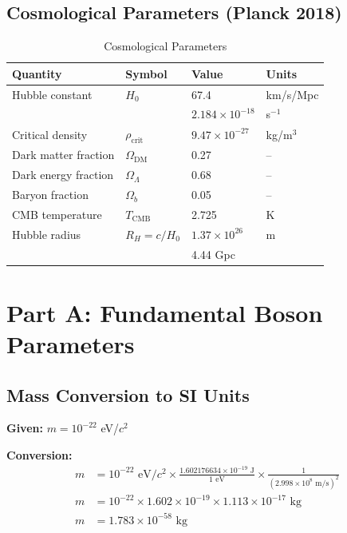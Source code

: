 \documentclass[11pt,a4paper]{article}
\newcommand{\ee}[1]{\times 10^{#1}}
\newcommand{\rhocrit}{\ensuremath{\rho_{\mathrm{crit}}}}
\begin{document}
\subsection{Cosmological Parameters (Planck 2018)}

\begin{table}[H]
\centering
\caption{Cosmological Parameters}
\label{tab:cosmo}
\begin{tabular}{@{}llll@{}}
\toprule
\textbf{Quantity} & \textbf{Symbol} & \textbf{Value} & \textbf{Units} \\
\midrule
Hubble constant & $H_0$ & 67.4 & km/s/Mpc \\
 & & $2.184 \ee{-18}$ & s$^{-1}$ \\
Critical density & $\rhocrit$ & $9.47 \ee{-27}$ & kg/m$^3$ \\
Dark matter fraction & $\Omega_{\mathrm{DM}}$ & 0.27 & -- \\
Dark energy fraction & $\Omega_\Lambda$ & 0.68 & -- \\
Baryon fraction & $\Omega_b$ & 0.05 & -- \\
CMB temperature & $T_{\mathrm{CMB}}$ & 2.725 & K \\
Hubble radius & $R_H = c/H_0$ & $1.37 \ee{26}$ & m \\
 & & 4.44 Gpc & \\
\bottomrule
\end{tabular}
\end{table}

\section{Part A: Fundamental Boson Parameters}
\label{sec:partA}

\subsection{Mass Conversion to SI Units}

\textbf{Given:} $m = 10^{-22}$ eV/$c^2$

\textbf{Conversion:}
\begin{align}
m &= 10^{-22} \text{ eV}/c^2 \times \frac{1.602176634 \ee{-19} \text{ J}}{1 \text{ eV}} \times \frac{1}{(2.998 \ee{8} \text{ m/s})^2} \nonumber \\
m &= 10^{-22} \times 1.602 \ee{-19} \times 1.113 \ee{-17} \text{ kg} \nonumber \\
m &= 1.783 \ee{-58} \text{ kg}
\end{align}
\end{document}
